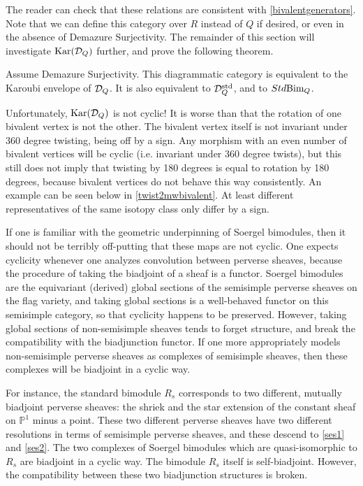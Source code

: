 The reader can check that these relations are consistent with \eqref{bivalentgenerators}. Note that we can define this category over $R$ instead of $Q$ if desired, or even in the absence
of Demazure Surjectivity. The remainder of this section will investigate $\textrm{Kar}({\mathcal{D}}_Q)$ further, and prove the following theorem.

\begin{thm} Assume Demazure Surjectivity. This diagrammatic category is equivalent to the Karoubi envelope of ${\mathcal{D}}_Q$. It is also equivalent to ${\mathcal{D}}^{\textrm{std}}_Q$, and to $Std\textrm{Bim}_Q$. \label{localdiagthm} \end{thm}

Unfortunately, $\textrm{Kar}({\mathcal{D}}_Q)$ is not cyclic! It is worse than that the rotation of one bivalent vertex is not the other. The bivalent vertex itself is not invariant under 360 degree
twisting, being off by a sign. Any morphism with an even number of bivalent vertices will be cyclic (i.e. invariant under 360 degree twists), but this still does not imply that twisting by
180 degrees is equal to rotation by 180 degrees, because bivalent vertices do not behave this way consistently. An example can be seen below in \eqref{twist2mwbivalent}. At least different
representatives of the same isotopy class only differ by a sign.

\begin{remark} \label{geometrynocyclic} If one is familiar with the geometric underpinning of Soergel bimodules, then it should not be terribly off-putting that these maps are not cyclic.
One expects cyclicity whenever one analyzes convolution between perverse sheaves, because the procedure of taking the biadjoint of a sheaf is a functor. Soergel bimodules are the
equivariant (derived) global sections of the semisimple perverse sheaves on the flag variety, and taking global sections is a well-behaved functor on this semisimple category, so that
cyclicity happens to be preserved. However, taking global sections of non-semisimple sheaves tends to forget structure, and break the compatibility with the biadjunction functor. If one
more appropriately models non-semisimple perverse sheaves as complexes of semisimple sheaves, then these complexes will be biadjoint in a cyclic way.

For instance, the standard bimodule $R_s$ corresponds to two different, mutually biadjoint perverse sheaves: the shriek and the star extension of the constant sheaf on $\mathbb{P}^1$ minus
a point. These two different perverse sheaves have two different resolutions in terms of semisimple perverse sheaves, and these descend to \eqref{ses1} and \eqref{ses2}. The two complexes
of Soergel bimodules which are quasi-isomorphic to $R_s$ are biadjoint in a cyclic way. The bimodule $R_s$ itself is self-biadjoint. However, the compatibility between these two
biadjunction structures is broken. \end{remark}

